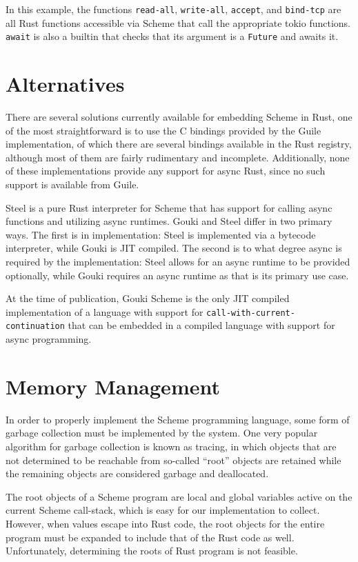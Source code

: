 \documentclass[sigplan,authordraft]{acmart}
\begin{document}
In this example, the functions \texttt{read-all}, \texttt{write-all},
\texttt{accept}, and \texttt{bind-tcp} are all Rust functions accessible via
Scheme that call the appropriate tokio functions. \texttt{await} is also
a builtin that checks that its argument is a \texttt{Future}\cite{future} and
awaits it.

\section{Alternatives}

There are several solutions currently available for embedding Scheme in Rust,
one of the most straightforward is to use the C bindings provided by the Guile
implementation, of which there are several bindings available in the Rust
registry, although most of them are fairly rudimentary and incomplete.
Additionally, none of these implementations provide any support for async Rust,
since no such support is available from Guile.

Steel\cite{steel} is a pure Rust interpreter for Scheme that has support for
calling async functions and utilizing async runtimes. Gouki and Steel differ in
two primary ways. The first is in implementation: Steel is implemented via a
bytecode interpreter, while Gouki is JIT compiled. The second is to what degree
async is required by the implementation: Steel allows for an async runtime to
be provided optionally, while Gouki requires an async runtime as that is its
primary use case.

At the time of publication, Gouki Scheme is the only JIT compiled implementation
of a language with support for \texttt{call-with-current-continuation} that can
be embedded in a compiled language with support for async programming.

\section{Memory Management}

In order to properly implement the Scheme programming language, some form of
garbage collection must be implemented by the system. One very popular algorithm
for garbage collection is known as tracing, in which objects that are not
determined to be reachable from so-called ``root'' objects are retained while 
the remaining objects are considered garbage and deallocated\cite{lisptracing}.

The root objects of a Scheme program are local and global variables active on the
current Scheme call-stack, which is easy for our implementation to collect.
However, when values escape into Rust code, the root objects for the entire
program must be expanded to include that of the Rust code as well. Unfortunately,
determining the roots of Rust program is not feasible\cite{rusttracing}.
\end{document}
